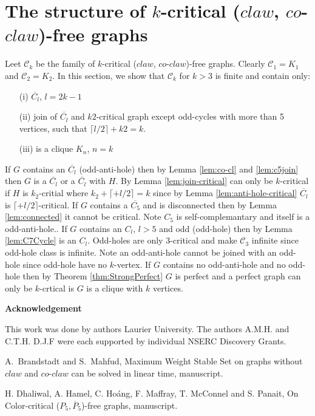 \documentclass[12pt]{article}
\def\CCO{($claw$, $co$-$claw$)}
\begin{document}
\section{The structure of $k$-critical {\CCO}-free graphs}\label{sec:characterization}
%
Leet $\mathcal{C}_k$ be the family of $k$-critical {\CCO}-free graphs. Clearly $\mathcal{C}_1 = {K_1}$ and $\mathcal{C}_2 = {K_2}$.
In this section, we show that $\mathcal{C}_k$ for $k > 3$ is finite and contain only:
\begin{itemize}
\item[(i)]
$\overline{C_l}$, $l = 2k-1$
\item[(ii)]
join of $\overline{C_l}$ and $k2$-critical graph except odd-cycles with more than 5 vertices, such that  $\lceil l/2 \rceil + k2 = k$.
\item[(iii)]
is a clique $K_n$, $n = k$
\end{itemize} 
 If $G$ contains an $\overline{C_l}$ (odd-anti-hole) then by Lemma \ref{lem:co-cl} and \ref{lem:c5join} then $G$ is a $\overline{C_l}$ or a $\overline{C_l}$ with $H$. By Lemma \ref{lem:join-critical} can only be $k$-critical if $H$ is $k_2$-critial where $k_2 + \lceil + l/2 \rceil = k$ since by Lemma \ref{lem:anti-hole-critical} $\overline{C_l}$ is $\lceil + l/2 \rceil$-critical. If $G$ contains a $\overline{C_5}$ and is disconnected then by Lemma \ref{lem:connected} it cannot be critical. Note $C_5$ is self-complemantary and itself is a odd-anti-hole.. If $G$ contains an $C_l$, $l >5$ and odd (odd-hole) then by Lemma \ref{lem:C7Cycle} is an $C_l$. Odd-holes are only 3-critical and make $\mathcal{C}_3$ infinite since odd-hole class is infinite. Note an odd-anti-hole cannot be joined with an odd-hole since odd-hole have no $k$-vertex. If $G$ contains no odd-anti-hole and no odd-hole then by Theorem \ref{thm:StrongPerfect} $G$ is perfect and a perfect graph can only be $k$-crtical is $G$ is a clique with $k$ vertices.

\begin{center}
{\bf Acknowledgement}
\end{center}
This work was done by authors  Laurier University.  The authors A.M.H. and C.T.H. D.J.F were each supported by individual NSERC Discovery Grants.


\clearpage
\begin{thebibliography}{99}

  A.~Brandstadt and S.~Mahfud, Maximum Weight Stable Set on graphs without $claw$ and $co$-$claw$ can be solved in linear time, manuscript.

  H. Dhaliwal, A. Hamel, C. Ho\'{a}ng, F. Maffray, T. McConnel and S. Panait, On Color-critical ($P_5, \overline{P}_5$)-free graphs, manuscript.

\end{thebibliography}
\end{document}
